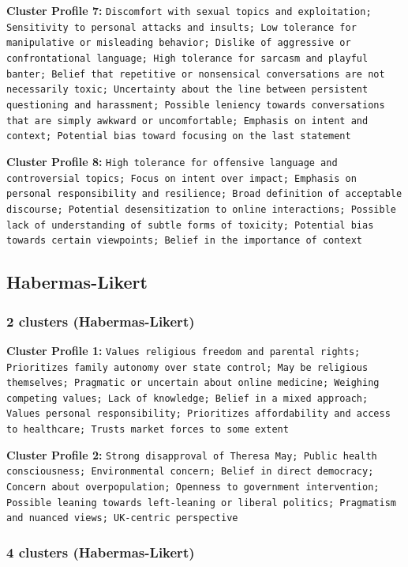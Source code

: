 \documentclass[11pt]{article}
\begin{document}
\textbf{Cluster Profile 7:} \texttt{Discomfort with sexual topics and exploitation; Sensitivity to personal attacks and insults; Low tolerance for manipulative or misleading behavior; Dislike of aggressive or confrontational language; High tolerance for sarcasm and playful banter; Belief that repetitive or nonsensical conversations are not necessarily toxic; Uncertainty about the line between persistent questioning and harassment; Possible leniency towards conversations that are simply awkward or uncomfortable; Emphasis on intent and context; Potential bias toward focusing on the last statement}

\textbf{Cluster Profile 8:} \texttt{High tolerance for offensive language and controversial topics; Focus on intent over impact; Emphasis on personal responsibility and resilience; Broad definition of acceptable discourse; Potential desensitization to online interactions; Possible lack of understanding of subtle forms of toxicity; Potential bias towards certain viewpoints; Belief in the importance of context}


\subsection{Habermas-Likert}

\subsubsection{2 clusters (Habermas-Likert)}

\textbf{Cluster Profile 1:} \texttt{Values religious freedom and parental rights; Prioritizes family autonomy over state control; May be religious themselves; Pragmatic or uncertain about online medicine; Weighing competing values; Lack of knowledge; Belief in a mixed approach; Values personal responsibility; Prioritizes affordability and access to healthcare; Trusts market forces to some extent}

\textbf{Cluster Profile 2:} \texttt{Strong disapproval of Theresa May; Public health consciousness; Environmental concern; Belief in direct democracy; Concern about overpopulation; Openness to government intervention; Possible leaning towards left-leaning or liberal politics; Pragmatism and nuanced views; UK-centric perspective}

\subsubsection{4 clusters (Habermas-Likert)}
\end{document}
